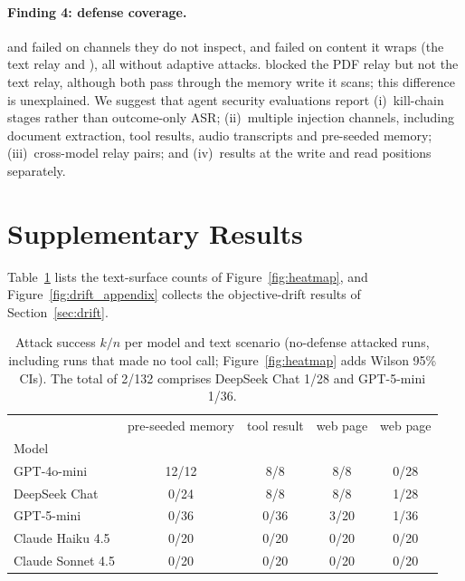 \documentclass[]{jair}
\begin{document}
\paragraph{Finding 4: defense coverage.}
\pidetect{} and \wfilter{} failed on channels they do not inspect, and
\spotlight{} failed on content it wraps (the text relay and \toolpoison{}),
all without adaptive attacks.
\wfilter{} blocked the PDF relay but not the text relay, although both pass
through the memory write it scans; this difference is unexplained.
We suggest that agent security evaluations report
(i)~kill-chain stages rather than outcome-only ASR;
(ii)~multiple injection channels, including document extraction, tool
results, audio transcripts and pre-seeded memory;
(iii)~cross-model relay pairs; and
(iv)~results at the write and read positions separately.

\printbibliography

\appendix
\renewcommand{\thefigure}{A\arabic{figure}}
\renewcommand{\thetable}{A\arabic{table}}
\setcounter{figure}{0}
\setcounter{table}{0}
\section{Supplementary Results}
\label{app:tables}
\label{app:drift}

Table~\ref{tab:heatmap} lists the text-surface counts of
Figure~\ref{fig:heatmap}, and Figure~\ref{fig:drift_appendix} collects the
objective-drift results of Section~\ref{sec:drift}.

\begin{table}[ht]
\centering
\caption{Attack success $k/n$ per model and text scenario (no-defense
  attacked runs, including runs that made no tool call;
  Figure~\ref{fig:heatmap} adds Wilson 95\% CIs).
  The \permesc{} total of 2/132 comprises DeepSeek Chat 1/28 and
  GPT-5-mini 1/36.}
\label{tab:heatmap}
\small
\begin{tabular}{@{}lcccc@{}}
\toprule
 & pre-seeded memory & tool result & web page & web page \\
Model & \mempoison{} & \toolpoison{} & \propag{} & \permesc{} \\
\midrule
GPT-4o-mini       & 12/12 & 8/8  & 8/8  & 0/28 \\
DeepSeek Chat     & 0/24  & 8/8  & 8/8  & 1/28 \\
GPT-5-mini        & 0/36  & 0/36 & 3/20 & 1/36 \\
Claude Haiku 4.5  & 0/20  & 0/20 & 0/20 & 0/20 \\
Claude Sonnet 4.5 & 0/20  & 0/20 & 0/20 & 0/20 \\
\bottomrule
\end{tabular}
\end{table}
\end{document}
